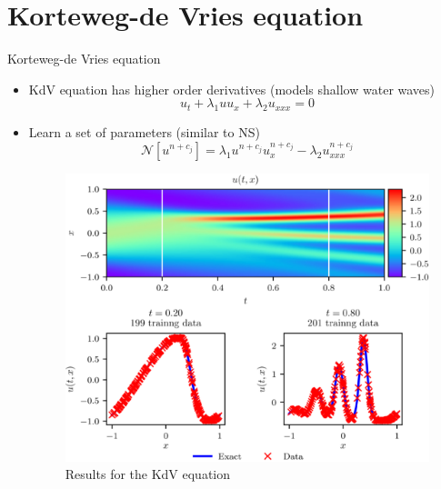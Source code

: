 \documentclass[xcolor=dvipsnames,10pt]{beamer}
\begin{document}
\section{Korteweg-de Vries equation}
\begin{frame}[t]{Korteweg-de Vries equation}
  \begin{itemize}
    \item<2-> \textrm{KdV} equation has higher order derivatives (models shallow water waves)
    $$
      u_{t}+\lambda_{1} u u_{x}+\lambda_{2} u_{x x x}=0
    $$
    \item<3-> Learn a set of parameters (similar to NS)
    $$
      \mathcal{N}\left[u^{n+c_{j}}\right]=\lambda_{1} u^{n+c_{j}} u_{x}^{n+c_{j}}-\lambda_{2} u_{x x x}^{n+c_{j}}
    $$
    \begin{figure}[H]
      \centering
      \includegraphics[width=0.6\linewidth]{utx2.eps}
      \caption{\footnotesize\centering
        Results for the KdV equation}
    \end{figure}
  \end{itemize}
\end{frame}
\end{document}
